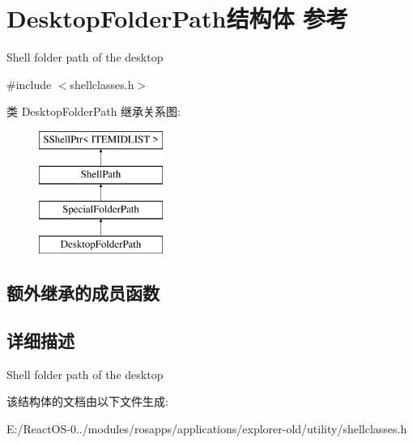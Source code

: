 \hypertarget{struct_desktop_folder_path}{}\section{Desktop\+Folder\+Path结构体 参考}
\label{struct_desktop_folder_path}


Shell folder path of the desktop  




{\ttfamily \#include $<$shellclasses.\+h$>$}

类 Desktop\+Folder\+Path 继承关系图\+:\begin{figure}[H]
\begin{center}
\leavevmode
\includegraphics[height=4.000000cm]{struct_desktop_folder_path}
\end{center}
\end{figure}
\subsection*{额外继承的成员函数}


\subsection{详细描述}
Shell folder path of the desktop 

该结构体的文档由以下文件生成\+:\begin{DoxyCompactItemize}
\item 
E\+:/\+React\+O\+S-\/0../modules/rosapps/applications/explorer-\/old/utility/shellclasses.\+h\end{DoxyCompactItemize}
